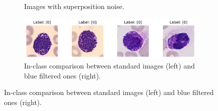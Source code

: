 \documentclass[11pt]{template}
\begin{document}
\begin{multicols}{2}
\begin{figure}[H]
\begin{subfigure}{\linewidth}
            \caption{Images with superposition noise.}
            \label{fig:filters1}
        \end{subfigure}
        \begin{subfigure}{\linewidth}
            \centering
            \includegraphics[width=\linewidth]{assets/blue_filter.png}
            \caption{In-class comparison between standard images (left) and blue filtered ones (right).}
            \label{fig:filters2}
        \end{subfigure}
\end{figure}
                

\end{multicols}
\end{document}
